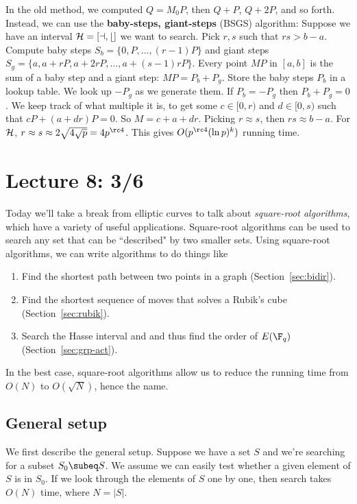 In the old method, we computed $Q=M_0P$, then $Q+P$, $Q+2P$, and so forth. Instead, we can use the \textbf{baby-steps, giant-steps} (BSGS) algorithm: Suppose we have an interval $\cal H=[a,b]$ we want to search. Pick $r,s$ such that $rs>b-a$. Compute baby steps $S_b=\{0,P,\ldots, (r-1)P\}$ and giant steps $S_g=\{a,a+rP,a+2rP,\ldots, a+(s-1)rP\}$. 
Every point $MP$ in $[a,b]$ is the sum of a baby step and a giant step: $MP=P_b+P_g$. Store the baby steps $P_b$ in a lookup table. %
We look up $-P_g$ as we generate them. 
If $P_b=-P_g$ then $P_b+P_g=0$. We keep track of what multiple it is, to get some $c\in [0,r)$ and $d\in [0,s)$ such that $cP+(a+dr)P=0$. So $M=c+a+dr$. Picking $r\approx s$, then $rs\approx b-a$. For $\cal H$, $r\approx s\approx 2\sqrt {4\sqrt p}=4p^{\rc 4}$. This gives $O(p^{\rc 4}(\ln p)^k)$ running time.
\section{Lecture 8: 3/6}
Today we'll take a break from elliptic curves to talk about {\it square-root algorithms}, which have a variety of useful applications. Square-root algorithms can be used to search any set that can be ``described" by two smaller sets. %
Using square-root algorithms, we can write algorithms to do things like
\begin{enumerate}
\item Find the shortest path between two points in a graph (Section~\ref{sec:bidir}).
\item Find the shortest sequence of moves that solves a Rubik's cube (Section~\ref{sec:rubik}).
\item Search the Hasse interval and and thus find the order of $E(\F_q)$ (Section~\ref{sec:grp-act}).
\end{enumerate}
In the best case, square-root algorithms allow us to reduce the running time from $O(N)$ to $O(\sqrt N)$, hence the name.
\subsection{General setup}\label{sec:general-setup}
We first describe the general setup. Suppose we have a set $S$ and we're searching for a subset $S_0\subeq S$. We assume we can easily test whether a given element of $S$ is in $S_0$. If we look through the elements of $S$ one by one, then search takes $O(N)$ time, where $N=|S|$.

